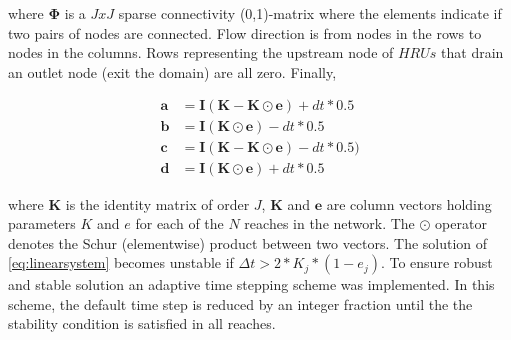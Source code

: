 where $\mathbf{\Phi}$ is a $JxJ$ sparse connectivity (0,1)-matrix where the elements indicate if two pairs of nodes are connected. Flow direction is from nodes in the rows to nodes in the columns. Rows representing the upstream node of $HRUs$ that drain an outlet node (exit the domain) are all zero. Finally,


\begin{align}
\mathbf{a} &= \mathbf{I} (\mathbf{K}-\mathbf{K\odot e}) + dt * 0.5\\
\mathbf{b} &= \mathbf{I} (\mathbf{K\odot e}) - dt * 0.5\\
\mathbf{c} &= \mathbf{I} (\mathbf{K}-\mathbf{K\odot e}) - dt * 0.5)\\
\mathbf{d} &= \mathbf{I} (\mathbf{K\odot e}) + dt * 0.5
\end{align}

\noindent where $\mathbf{K}$ is the identity matrix of order $J$, $\mathbf{K}$ and $\mathbf{e}$ are column vectors holding parameters $K$ and $e$ for each of the $N$ reaches in the network. The $\odot$ operator denotes the Schur (elementwise) product between two vectors.
The solution of \eqref{eq:linearsystem} becomes unstable if $\Delta t > 2 * K_j * (1 - e_j)$. To ensure robust and stable solution an adaptive time stepping scheme was implemented. In this scheme, the default time step is reduced by an integer fraction until the the stability condition is satisfied in all reaches. 



